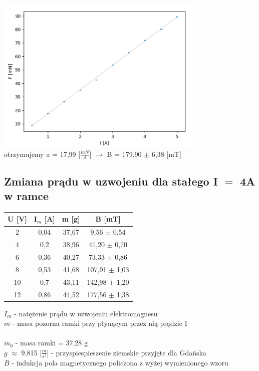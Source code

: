 \documentclass{article}
\begin{document}
\includegraphics[width=10cm]{EEEE}
\\otrzymujemy a = 17,99 [$\frac{mN}{A}$] $\rightarrow$ B = 179,90 $\pm$ 6,38 [mT]



\subsection{Zmiana prądu w uzwojeniu dla stałego I $=$ 4A w ramce }

\begin{center}
  \begin{tabular}{ c | c | c | c}
  U [V] & I$_m$ [A] & m [g] & B [mT]\\
  \hline
  2 & 0,04 & 37,67 & 9,56 $\pm$ 0,54\\
  4 & 0,2 & 38,96 & 41,20 $\pm$ 0,70\\
  6 & 0,36 & 40,27 & 73,33 $\pm$ 0,86\\
  8 & 0,53 & 41,68 & 107,91 $\pm$ 1,03\\
  10 & 0,7 & 43,11 & 142,98 $\pm$ 1,20\\
  12 & 0,86 & 44,52 & 177,56 $\pm$ 1,38\\
  \end{tabular}
\end{center}
$I_m$ - natężenie prądu w uzwojeniu elektromagnesu \\
$m$ - masa pozorna ramki przy płynącym przez nią prądzie I \\\\
$m_0$ - masa ramki = 37,28 g\\
$g$ $\approx$ 9,815 [$\frac{m}{s^2}$] - przyspiespieszenie ziemskie przyjęte dla Gdańska \\
$B$ - indukcja pola magnetycznego policzona z wyżej wymienionego wzoru 
\end{document}
